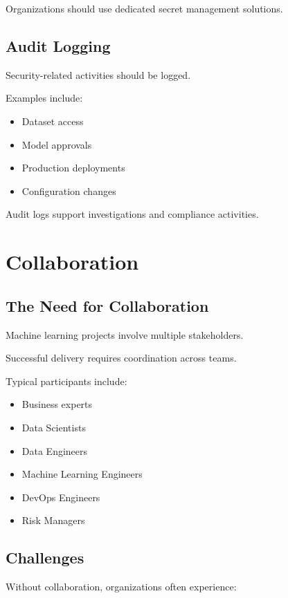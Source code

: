 Organizations should use dedicated secret management solutions.

\subsection{Audit Logging}

Security-related activities should be logged.

Examples include:

\begin{itemize}
    \item Dataset access
    \item Model approvals
    \item Production deployments
    \item Configuration changes
\end{itemize}

Audit logs support investigations and compliance activities.

\section{Collaboration}

\subsection{The Need for Collaboration}

Machine learning projects involve multiple stakeholders.

Successful delivery requires coordination across teams.

Typical participants include:

\begin{itemize}
    \item Business experts
    \item Data Scientists
    \item Data Engineers
    \item Machine Learning Engineers
    \item DevOps Engineers
    \item Risk Managers
\end{itemize}

\subsection{Challenges}

Without collaboration, organizations often experience:

